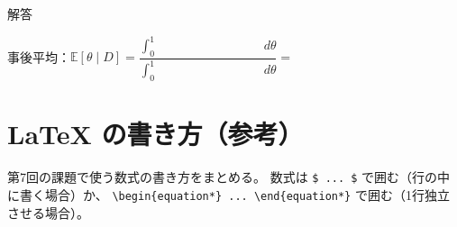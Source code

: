 \documentclass[a4paper,dvipdfmx]{jsarticle}
\newcommand{\提出期限}{2026年11月9日（月）}
\newcommand{\学籍番号}{0000000}
\newcommand{\氏名}{氏名を書く}
\newcommand{\提出日}{2026年11月9日}
\newenvironment{answer}{\begin{itembox}[l]{解答}}{\end{itembox}}
\begin{document}
\begin{enumerate}
\begin{answer}
\begin{enumerate}
          事後平均：$\mathbb{E}[\theta \mid D] = \dfrac{\int_0^1 \phantom{XXXXXXXXXX}\,d\theta}{\int_0^1 \phantom{XXXXXXXXXX}\,d\theta} = $ \phantom{XXXXXXXXXXXX}
          \vspace{8mm}
      \end{enumerate}
    \end{answer}

\end{enumerate}

\newpage
\section*{LaTeX の書き方（参考）}

第7回の課題で使う数式の書き方をまとめる。
数式は \verb|$ ... $| で囲む（行の中に書く場合）か、
\verb|\begin{equation*} ... \end{equation*}| で囲む（1行独立させる場合）。
\end{document}
